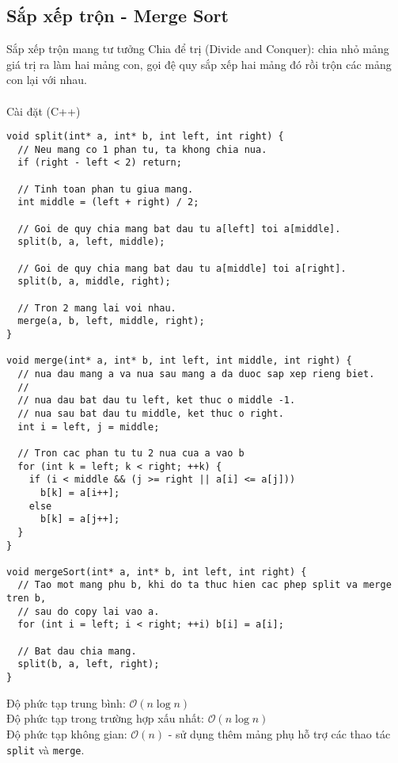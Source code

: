 \documentclass[]{article}
\begin{document}
\subsection{Sắp xếp trộn - Merge Sort}
Sắp xếp trộn mang tư tưởng Chia để trị (Divide and Conquer): chia nhỏ mảng giá trị ra làm hai mảng con, gọi đệ quy sắp xếp hai mảng đó rồi trộn các mảng con lại với nhau.
\\\\
Cài đặt (C++)
\begin{lstlisting}
void split(int* a, int* b, int left, int right) {
  // Neu mang co 1 phan tu, ta khong chia nua.
  if (right - left < 2) return;

  // Tinh toan phan tu giua mang.
  int middle = (left + right) / 2;

  // Goi de quy chia mang bat dau tu a[left] toi a[middle].
  split(b, a, left, middle);

  // Goi de quy chia mang bat dau tu a[middle] toi a[right].
  split(b, a, middle, right);

  // Tron 2 mang lai voi nhau.
  merge(a, b, left, middle, right);
}

void merge(int* a, int* b, int left, int middle, int right) {
  // nua dau mang a va nua sau mang a da duoc sap xep rieng biet.
  //
  // nua dau bat dau tu left, ket thuc o middle -1.
  // nua sau bat dau tu middle, ket thuc o right.
  int i = left, j = middle;

  // Tron cac phan tu tu 2 nua cua a vao b
  for (int k = left; k < right; ++k) {
    if (i < middle && (j >= right || a[i] <= a[j]))
      b[k] = a[i++];
    else
      b[k] = a[j++];
  }
}

void mergeSort(int* a, int* b, int left, int right) {
  // Tao mot mang phu b, khi do ta thuc hien cac phep split va merge tren b,
  // sau do copy lai vao a.
  for (int i = left; i < right; ++i) b[i] = a[i];

  // Bat dau chia mang.
  split(b, a, left, right);
}
\end{lstlisting}
Độ phức tạp trung bình: $\mathcal{O}(n \log n)$
\\
Độ phức tạp trong trường hợp xấu nhất: $\mathcal{O}(n \log n)$
\\
Độ phức tạp không gian: $\mathcal{O}(n)$ - sử dụng thêm mảng phụ hỗ trợ các thao tác \texttt{split} và \texttt{merge}.
\end{document}

